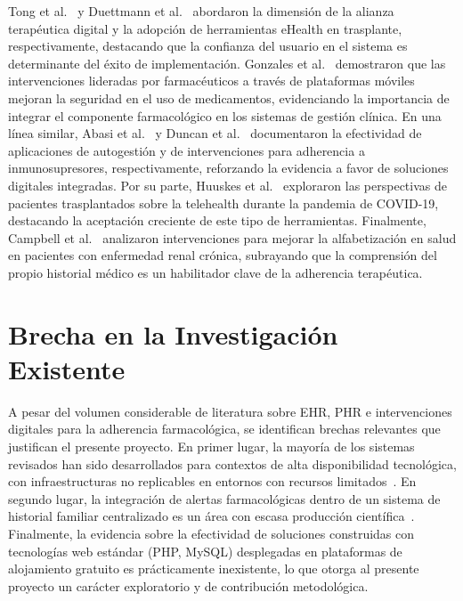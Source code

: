 \documentclass[12pt, letterpaper]{report}
\begin{document}
Tong et al.~\cite{tong2022digital} y Duettmann et al.~\cite{duettmann2021ehealth}
abordaron la dimensión de la alianza terapéutica digital y la adopción de herramientas
eHealth en trasplante, respectivamente, destacando que la confianza del usuario en el
sistema es determinante del éxito de implementación. Gonzales et al.~\cite{gonzales2021pharmacist}
demostraron que las intervenciones lideradas por farmacéuticos a través de plataformas
móviles mejoran la seguridad en el uso de medicamentos, evidenciando la importancia
de integrar el componente farmacológico en los sistemas de gestión clínica. En una
línea similar, Abasi et al.~\cite{abasi2021effectiveness} y Duncan et al.~\cite{duncan2018systematic}
documentaron la efectividad de aplicaciones de autogestión y de intervenciones para
adherencia a inmunosupresores, respectivamente, reforzando la evidencia a favor de
soluciones digitales integradas. Por su parte, Huuskes et al.~\cite{huuskes2021kidney}
exploraron las perspectivas de pacientes trasplantados sobre la telehealth durante la
pandemia de COVID-19, destacando la aceptación creciente de este tipo de
herramientas. Finalmente, Campbell et al.~\cite{campbell2022interventions} analizaron
intervenciones para mejorar la alfabetización en salud en pacientes con enfermedad
renal crónica, subrayando que la comprensión del propio historial médico es un
habilitador clave de la adherencia terapéutica.

\section{Brecha en la Investigación Existente}

A pesar del volumen considerable de literatura sobre EHR, PHR e intervenciones
digitales para la adherencia farmacológica, se identifican brechas relevantes que
justifican el presente proyecto. En primer lugar, la mayoría de los sistemas revisados
han sido desarrollados para contextos de alta disponibilidad tecnológica, con
infraestructuras no replicables en entornos con recursos
limitados~\cite{roehrs2017omniphr, tsai2020effects}. En segundo lugar, la integración
de alertas farmacológicas dentro de un sistema de historial familiar centralizado es
un área con escasa producción científica~\cite{okati2025mobile}. Finalmente, la
evidencia sobre la efectividad de soluciones construidas con tecnologías web estándar
(PHP, MySQL) desplegadas en plataformas de alojamiento gratuito es prácticamente
inexistente, lo que otorga al presente proyecto un carácter exploratorio y de
contribución metodológica.

\newpage


\end{document}
